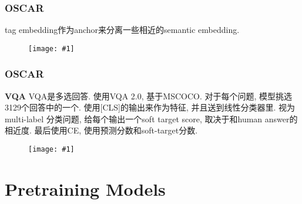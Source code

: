 \documentclass{beamer}
\newcommand{\cfig}[2]{
    \begin{figure}[htbp]
    \centering
    \texttt{[image: \#1]}
\end{figure}
}
\newcommand{\bt}[1]{\textbf{#1}}
\begin{document}
\begin{frame}
    \frametitle{OSCAR}

    tag embedding作为anchor来分离一些相近的semantic embedding.
    \cfig{OSCAR-arch.png}{1.0}


\end{frame}

\begin{frame}
    \frametitle{OSCAR}

    \bt{VQA}
    VQA是多选回答. 使用VQA 2.0, 基于MSCOCO. 对于每个问题, 模型挑选3129个回答中的一个. 使用[CLS]的输出来作为特征, 并且送到线性分类器里. 视为multi-label 分类问题, 给每个输出一个soft target score, 取决于和human answer的相近度. 最后使用CE, 使用预测分数和soft-target分数.
        
    \cfig{OSCAR-net.png}{0.9}

\end{frame}


\section{Pretraining Models}
\end{document}
